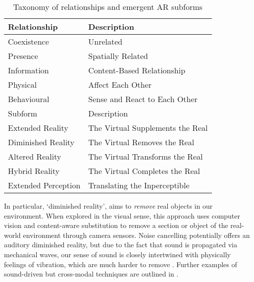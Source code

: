 \begin{table}[ht]
    \centering
    \begin{tabular}{ l l }
        \toprule
        Relationship        & Description                       \\
        \midrule
        Coexistence         & Unrelated                         \\
        Presence            & Spatially Related                 \\
        Information         & Content-Based Relationship        \\
        Physical            & Affect Each Other                 \\
        Behavioural         & Sense and React to Each Other     \\
        \midrule
        \midrule
        Subform             & Description                       \\
        \midrule
        Extended Reality    & The Virtual Supplements the Real  \\
        Diminished Reality  & The Virtual Removes the Real      \\
        Altered Reality     & The Virtual Transforms the Real   \\
        Hybrid Reality      & The Virtual Completes the Real    \\
        Extended Perception & Translating the Inperceptible     \\
        \bottomrule
    \end{tabular}
    \captionsetup{justification=centering,margin=1.5cm}
    \caption{Taxonomy of relationships and emergent AR subforms \citep[in][]{schraffenberger2018}}\label{table:schraffenbergertaxonomy}
\end{table}

In particular, `diminished reality', aims to \textit{remove} real objects in our environment. When explored in the visual sense, this approach uses computer vision and content-aware substitution to remove a section or object of the real-world environment through camera sensors. Noise cancelling potentially offers an auditory diminished reality, but due to the fact that sound is propagated via mechanical waves, our sense of sound is closely intertwined with physically feelings of vibration, which are much harder to remove \citep{mori2017}. Further examples of sound-driven but cross-modal techniques are outlined in \citep{walther-hansen2020}.

